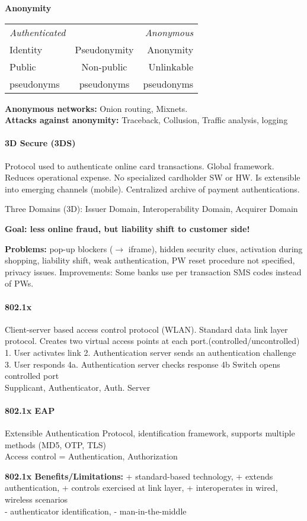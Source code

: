 \textbf{Anonymity}

\begin{tabular}{lcr}
\emph{Authenticated} & & \emph{Anonymous} \\
Identity & Pseudonymity & Anonymity \\
\hline
Public & Non-public & Unlinkable \\
pseudonyms & pseudonyms & pseudonyms \\
\end{tabular}

\textbf{Anonymous networks:} Onion routing, Mixnets. \\
\textbf{Attacks against anonymity:} Traceback, Collusion, Traffic analysis, logging

\paragraph{3D Secure (3DS)}
Protocol used to authenticate online card transactions. Global framework. Reduces operational expense. No specialized cardholder SW or HW. Is extensible into emerging channels (mobile). Centralized archive of payment authentications.

Three Domains (3D): Issuer Domain, Interoperability Domain, Acquirer Domain

\textbf{Goal: less online fraud, but liability shift to customer side!}

\textbf{Problems:} pop-up blockers ($\to$ iframe), hidden security clues, activation during
shopping, liability shift, weak authentication, PW reset procedure not specified, privacy issues. Improvements: Some banks use per transaction SMS codes instead of PWs.

\paragraph{802.1x}
Client-server based access control protocol (WLAN). Standard data link layer protocol. 
Creates two virtual access points at each port.(controlled/uncontrolled) 1. User activates link 2. Authentication server sends an authentication challenge 3. User responds 4a. Authentication server checks response 4b Switch opens controlled port \\
 Supplicant, Authenticator, Auth. Server

\paragraph{802.1x EAP}
Extensible Authentication Protocol, identification framework, supports multiple
methods (MD5, OTP, TLS) \\
Access control = Authentication, Authorization

\textbf{802.1x Benefits/Limitations:} + standard-based technology, + extends authentication, + controls exercised at link layer, + interoperates in wired, wireless scenarios\\
- authenticator identification, - man-in-the-middle

